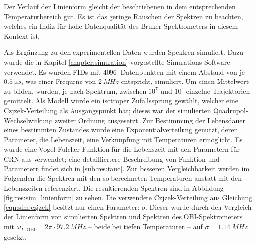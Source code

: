 Der Verlauf der Linienform gleicht der beschriebenen in dem entsprechenden Temperaturbereich gut. Es ist das geringe Rauschen der Spektren zu beachten, welches ein Indiz für hohe Datenqualität des Bruker-Spektrometers in diesem Kontext ist.

Als Ergänzung zu den experimentellen Daten wurden Spektren simuliert. Dazu wurde die in Kapitel \ref{chapter:simulation} vorgestellte Simulations-Software verwendet. Es wurden FIDs mit $\SI{4096}{}$ Datenpunkten mit einem Abstand von je $\SI{0.5}{\micro s}$, was einer Frequenz von $\SI{2}{MHz}$ entspricht, simuliert. Um einen Mittelwert zu bilden, wurden, je nach Spektrum, zwischen $10^{7}$ und $10^{9}$ einzelne Trajektorien gemittelt. Als Modell wurde ein isotroper Zufallssprung gewählt, welcher eine Czjzek-Verteilung als Ausgangspunkt hat; dieses war der simulierten Quadrupol-Wechselwirkung zweiter Ordnung ausgesetzt. Zur Bestimmung der Lebensdauer eines bestimmten Zustandes wurde eine Exponentialverteilung genutzt, deren Parameter, die Lebenszeit, eine Verknüpfung mit Temperaturen ermöglicht. Es wurde eine Vogel-Fulcher-Funktion für die Lebenszeit mit den Parametern für CRN aus \cite{PIMENOV199793} verwendet; eine detailliertere Beschreibung von Funktion und Parametern findet sich in \ref{sub:res:tauc}. Zur besseren Vergleichbarkeit werden im Folgenden die Spektren mit den so berechneten Temperaturen anstatt mit den Lebenszeiten referenziert. Die resultierenden Spektren sind in Abbildung \ref{fig:res:sim_linienform} zu sehen. Die verwendete Czjzek-Verteilung aus Gleichung \eqref{eqn:sim:czjzek} besitzt nur einen Parameter: $\sigma$. Dieser wurde durch den Vergleich der Linienform von simulierten Spektren und Spektren des OBI-Spektrometers mit $\omega_{L, \text{OBI}} = 2\pi \cdot \SI{97.2}{MHz}$ -- beide bei tiefen Temperaturen -- auf $\sigma = \SI{1.14}{MHz}$ gesetzt.

